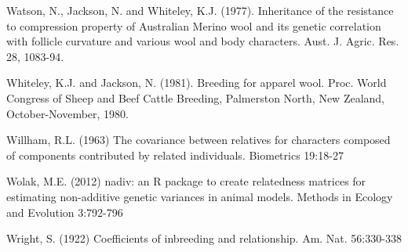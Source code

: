 \documentclass[titlepage]{article}  %
\begin{document}
\begin{thebibliography}{99}
Watson, N., Jackson, N. and Whiteley, K.J. (1977).  Inheritance of the
    resistance to compression property of Australian Merino wool and its
    genetic correlation with follicle curvature and various wool and body
    characters.  Aust. J. Agric. Res. 28, 1083-94.

Whiteley, K.J. and Jackson, N. (1981).  Breeding for apparel wool.  Proc.
    World Congress of Sheep and Beef Cattle Breeding, Palmerston North, New
    Zealand, October-November, 1980.

Willham, R.L. (1963) The covariance between relatives for characters composed
    of components contributed by related individuals. Biometrics 19:18-27

Wolak, M.E. (2012) nadiv: an R package to create relatedness matrices for
    estimating non-additive genetic variances in animal models. 
    Methods in Ecology and Evolution 3:792-796

Wright, S. (1922) Coefficients of inbreeding and relationship. 
    Am. Nat. 56:330-338

\end{thebibliography}
\end{document}
